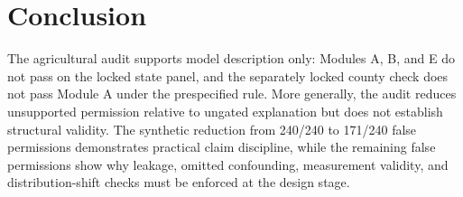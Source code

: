 \documentclass[conference]{IEEEtran}
\begin{document}
\section{Conclusion}
The agricultural audit supports model description only: Modules A, B, and E do not pass
on the locked state panel, and the separately locked county check does not
pass Module A under the prespecified rule. More generally, the audit reduces unsupported
permission relative to ungated explanation but does not establish structural
validity. The synthetic reduction from 240/240 to 171/240 false permissions
demonstrates practical claim discipline, while the remaining false permissions show why
leakage, omitted confounding, measurement validity, and distribution-shift checks
must be enforced at the design stage.



\end{document}
